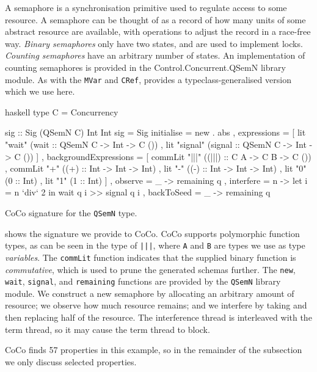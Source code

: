 A semaphore is a synchronisation primitive used to regulate access to
some resource\cite{ewd123}.  A semaphore can be thought of as a record
of how many units of some abstract resource are available, with
operations to adjust the record in a race-free way.  \emph{Binary
  semaphores} only have two states, and are used to implement
locks. \emph{Counting semaphores} have an arbitrary number of states.
An implementation of counting semaphores is provided in the
Control.Concurrent.QSemN library module.  As with the \verb|MVar| and
\verb|CRef|, \dejafu{} provides a typeclass-generalised version which
we use here.

\begin{listing}
\centering
\begin{cminted}{haskell}
type C = Concurrency

sig :: Sig (QSemN C) Int Int
sig = Sig
  { initialise = new . abs
  , expressions =
    [ lit "wait"   (wait   :: QSemN C -> Int -> C ())
    , lit "signal" (signal :: QSemN C -> Int -> C ())
    ]
  , backgroundExpressions =
    [ commLit "|||" ((|||) :: C A -> C B -> C ())
    , commLit "+"   ((+)   :: Int -> Int -> Int)
    , lit "-"       ((-)   :: Int -> Int -> Int)
    , lit "0" (0 :: Int)
    , lit "1" (1 :: Int)
    ]
  , observe    = \q _ -> remaining q
  , interfere  = \q n -> let i = n `div` 2 in wait q i >> signal q i
  , backToSeed = \q _ -> remaining q
  }
\end{cminted}
\caption{CoCo signature for the \texttt{QSemN} type.}
\label{lst:sig}
\end{listing}

 shows the signature we provide to CoCo.  CoCo supports
polymorphic function types, as can be seen in the type of \verb#|||#,
where \verb|A| and \verb|B| are types we use as type \emph{variables}.
The \verb|commLit| function indicates that the supplied binary
function is \emph{commutative}, which is used to prune the generated
schemas further.  The \verb|new|, \verb|wait|, \verb|signal|, and
\verb|remaining| functions are provided by the \verb|QSemN| library
module.  We construct a new semaphore by allocating an arbitrary
amount of resource; we observe how much resource remains; and we
interfere by taking and then replacing half of the resource.  The
interference thread is interleaved with the term thread, so it may
cause the term thread to block.

CoCo finds 57 properties in this example, so in the remainder of the
subsection we only discuss selected properties.

